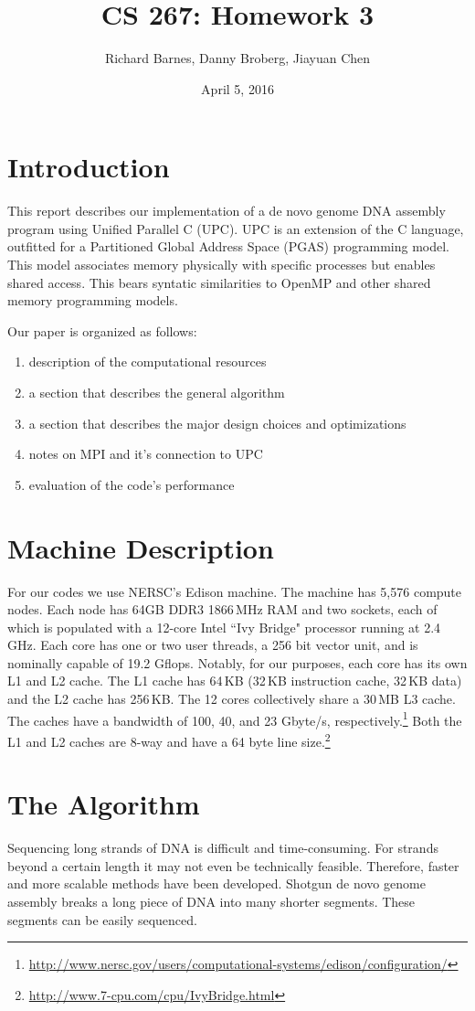 \documentclass{article}
\title{CS 267: Homework 3}
\author{Richard Barnes, Danny Broberg, Jiayuan Chen}
\date{April 5, 2016}
\begin{document}
\maketitle

\section{Introduction}
This report describes our implementation of a de novo genome DNA assembly program using Unified Parallel C (UPC). UPC is an extension of the C language, outfitted for a Partitioned Global Address Space (PGAS) programming model. This model associates memory physically with specific processes but enables shared access. This bears syntatic similarities to OpenMP and other shared memory programming models.

Our paper is organized as follows:
\begin{enumerate} %
\item description of the computational resources
\item a section that describes the general algorithm 
\item a section that describes the major design choices and optimizations
\item notes on MPI and it's connection to UPC
\item evaluation of the code's performance
\end{enumerate}

\section{Machine Description}
For our codes we use NERSC's Edison machine. The machine has 5,576 compute nodes. Each node has 64GB DDR3 1866\,MHz RAM and two sockets, each of which is populated with a 12-core Intel ``Ivy Bridge" processor running at 2.4\,GHz. Each core has one or two user threads, a 256 bit vector unit, and is nominally capable of 19.2 Gflops. Notably, for our purposes, each core has its own L1 and L2 cache. The L1 cache has 64\,KB (32\,KB instruction cache, 32\,KB data) and the L2 cache has 256\,KB. The 12 cores collectively share a 30\,MB L3 cache. The caches have a bandwidth of 100, 40, and 23 Gbyte/s, respectively.\footnote{\url{http://www.nersc.gov/users/computational-systems/edison/configuration/}} Both the L1 and L2 caches are 8-way and have a 64 byte line size.\footnote{\url{http://www.7-cpu.com/cpu/IvyBridge.html}} 


\section{The Algorithm}
Sequencing long strands of DNA is difficult and time-consuming. For strands beyond a certain length it may not even be technically feasible. Therefore, faster and more scalable methods have been developed. Shotgun de novo genome assembly breaks a long piece of DNA into many shorter segments. These segments can be easily sequenced.
\end{document}
